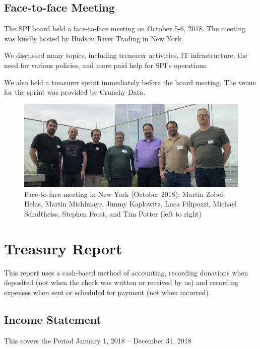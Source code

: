 \documentclass[a4paper]{report}
\begin{document}
\section{Face-to-face Meeting}

The SPI board held a face-to-face meeting on October 5-6, 2018.
The meeting was kindly hosted by Hudson River Trading in New York.

We discussed many topics, including treasurer activities, IT
infrastructure, the need for various policies, and more paid help for
SPI's operations.

We also held a treasurer sprint immediately before the board meeting.
The venue for the sprint was provided by Crunchy Data.

\begin{figure}[h]
\centering

\includegraphics[scale=0.14]{images/2018-october-f2f}

\caption{Face-to-face meeting in New York (October 2018): Martin
Zobel-Helas, Martin Michlmayr, Jimmy Kaplowitz, Luca Filipozzi, Michael
Schultheiss, Stephen Frost, and Tim Potter (left to right)}

\end{figure}

\chapter{Treasury Report}

This report uses a cash-based method of accounting, recording donations
when deposited (not when the check was written or received by us) and
recording expenses when sent or scheduled for payment (not when
incurred).

\section{Income Statement}

This covers the Period January 1, 2018 -- December 31, 2018
\end{document}
